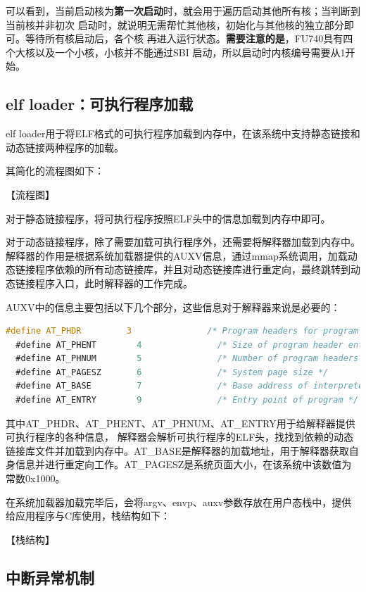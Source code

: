 \documentclass[UTF8,a4paper,10pt]{ctexart}
\begin{document}
可以看到，当前启动核为\textbf{第一次启动}时，就会用于遍历启动其他所有核；当判断到当前核并非初次
启动时，就说明无需帮忙其他核，初始化与其他核的独立部分即可。等待所有核启动后，各个核
再进入运行状态。\textbf{需要注意的是}，FU740具有四个大核以及一个小核，小核并不能通过SBI
启动，所以启动时内核编号需要从1开始。

\subsection{elf loader：可执行程序加载}

elf loader用于将ELF格式的可执行程序加载到内存中，在该系统中支持静态链接和动态链接两种程序的加载。

其简化的流程图如下：

【流程图】

对于静态链接程序，将可执行程序按照ELF头中的信息加载到内存中即可。

对于动态链接程序，除了需要加载可执行程序外，还需要将解释器加载到内存中。解释器的作用是根据系统加载器提供的AUXV信息，通过mmap系统调用，加载动态链接程序依赖的所有动态链接库，并且对动态链接库进行重定向，最终跳转到动态链接程序入口，此时解释器的工作完成。

AUXV中的信息主要包括以下几个部分，这些信息对于解释器来说是必要的：

\begin{lstlisting}[title=AUXV信息,frame=trbl,language={C}]
  #define AT_PHDR         3               /* Program headers for program */
  #define AT_PHENT        4               /* Size of program header entry */
  #define AT_PHNUM        5               /* Number of program headers */
  #define AT_PAGESZ       6               /* System page size */
  #define AT_BASE         7               /* Base address of interpreter */
  #define AT_ENTRY        9               /* Entry point of program */
  \end{lstlisting}

其中AT\_PHDR、AT\_PHENT、AT\_PHNUM、AT\_ENTRY用于给解释器提供可执行程序的各种信息，
解释器会解析可执行程序的ELF头，找找到依赖的动态链接库文件并加载到内存中。AT\_BASE是解释器的加载地址，用于解释器获取自身信息并进行重定向工作。AT\_PAGESZ是系统页面大小，在该系统中该数值为常数0x1000。

在系统加载器加载完毕后，会将argv、envp、auxv参数存放在用户态栈中，提供给应用程序与C库使用，栈结构如下：

【栈结构】
  

\subsection{中断异常机制}
\end{document}
